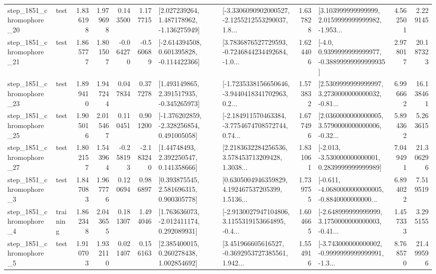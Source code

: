 \begin{tabular}{llrrrrllrlrr}
 step\_1851\_chromophore\_20 &      test &      1.836198 &    1.979698 &      0.143500 &  1.177715 &    [2.027239264, 1.487178962, -1.136275949] &  [-3.3306090902000527, -2.1255212553290037, 1.8... &       1.637828 &  [3.103999999999999, 2.0159999999999982, -1.953... &            4.562501 &          2.229145 \\
 step\_1851\_chromophore\_21 &      test &      1.865777 &    1.801507 &     -0.064270 & -0.560689 &   [-2.614394508, 0.601395828, -0.114422366] &  [3.7836876527729593, -0.7246844234492684, -1.0... &       1.624406 &   [-4.0, 0.9399999999999977, -0.38899999999999935] &            2.978017 &         20.187323 \\
 step\_1851\_chromophore\_23 &      test &      1.899410 &    1.947244 &      0.047834 &  0.377278 &    [1.493149865, 2.391517935, -0.345265973] &  [-1.7235338156650646, -3.9440418341702963, 0.2... &       1.573832 &  [2.5309999999999997, 3.2730000000000032, -0.81... &            6.996662 &         16.138461 \\
 step\_1851\_chromophore\_25 &      test &      1.905016 &    2.015467 &      0.110451 &  0.901200 &   [-1.376202859, -2.328256854, 0.491005058] &  [-2.184911570463384, -3.7754674708572744, 0.74... &       1.677496 &  [2.0360000000000005, 3.5790000000000006, -0.32... &            5.894362 &          5.263615 \\
 step\_1851\_chromophore\_27 &      test &      1.802157 &    1.543964 &     -0.258193 & -2.183240 &      [1.44748493, 2.392250547, 0.141358666] &  [2.2183632284256536, 3.578453713209428, 1.3038... &       1.831061 &   [-2.013, -3.530000000000001, 0.2839999999999989] &            7.049491 &         21.306296 \\
  step\_1851\_chromophore\_3 &      test &      1.847083 &    1.967776 &      0.120694 &  0.986897 &     [0.393875545, 2.581696315, 0.900305778] &  [0.6305004946359829, 4.192467537205399, 1.5136... &       1.739755 &  [-0.611, -4.0680000000000005, -0.8840000000000... &            6.894022 &          7.519519 \\
  step\_1851\_chromophore\_4 &  training &      1.862348 &    2.043655 &      0.181307 &  1.494046 &    [1.763636073, -2.012411174, 0.292089931] &  [-2.9130027947104806, 3.1155319153664895, -0.4... &       1.604665 &  [-2.648999999999999, 3.1750000000000003, -0.41... &            1.457333 &          3.295155 \\
  step\_1851\_chromophore\_5 &      test &      1.910703 &    1.932110 &      0.021407 &  0.156163 &     [2.385400015, 0.260278438, 1.002854692] &  [3.451966605616527, -0.3692953727385561, 1.942... &       1.554916 &  [-3.743000000000002, -0.9999999999999991, -1.3... &            8.768570 &         21.499596 \\

\end{tabular}
